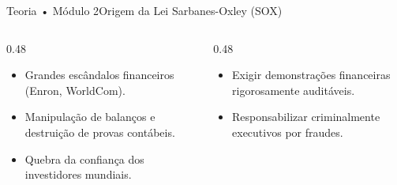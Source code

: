 \begin{senaiframe}{Teoria • Módulo 2}{Origem da Lei Sarbanes-Oxley (SOX)}
  \begin{columns}[t]
    \begin{column}{0.48\textwidth}
      \begin{tcolorbox}[senairedcard, title={O Contexto Histórico (2002)}]
        \begin{itemize}
          \item Grandes escândalos financeiros (Enron, WorldCom).
          \item Manipulação de balanços e destruição de provas contábeis.
          \item Quebra da confiança dos investidores mundiais.
        \end{itemize}
      \end{tcolorbox}
    \end{column}
    \begin{column}{0.48\textwidth}
      \begin{tcolorbox}[senaibluecard, title={Objetivo da Lei}]
        \begin{itemize}
          \item Exigir demonstrações financeiras rigorosamente auditáveis.
          \item Responsabilizar criminalmente executivos por fraudes.
        \end{itemize}
      \end{tcolorbox}
    \end{column}
  \end{columns}
\end{senaiframe}

